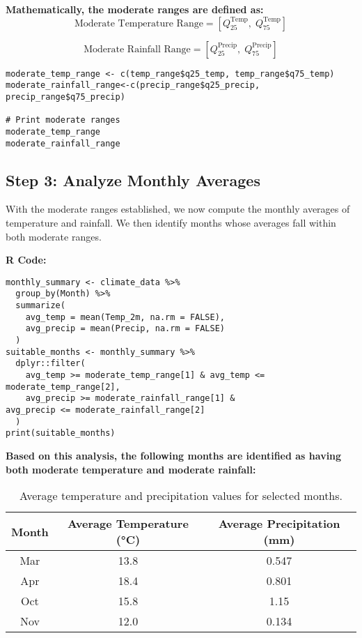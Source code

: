 \textbf{Mathematically, the moderate ranges are defined as:}
\[
\text{Moderate Temperature Range} = \left[ Q^{\text{Temp}}_{25},\; Q^{\text{Temp}}_{75} \right]
\]

\[
\text{Moderate Rainfall Range} = \left[ Q^{\text{Precip}}_{25},\; Q^{\text{Precip}}_{75} \right]
\]

\begin{verbatim}
moderate_temp_range <- c(temp_range$q25_temp, temp_range$q75_temp)
moderate_rainfall_range<-c(precip_range$q25_precip, precip_range$q75_precip)

# Print moderate ranges
moderate_temp_range
moderate_rainfall_range
\end{verbatim}

\subsection*{Step 3: Analyze Monthly Averages}
With the moderate ranges established, we now compute the monthly averages of temperature and rainfall. We then identify months whose averages fall within both moderate ranges.

\textbf{R Code:}
\begin{verbatim}
monthly_summary <- climate_data %>%
  group_by(Month) %>%
  summarize(
    avg_temp = mean(Temp_2m, na.rm = FALSE),
    avg_precip = mean(Precip, na.rm = FALSE)
  )
suitable_months <- monthly_summary %>%
  dplyr::filter(
    avg_temp >= moderate_temp_range[1] & avg_temp <= moderate_temp_range[2],
    avg_precip >= moderate_rainfall_range[1] & 
avg_precip <= moderate_rainfall_range[2]
  )
print(suitable_months)
\end{verbatim}

\textbf{Based on this analysis, the following months are identified as having both moderate temperature and moderate rainfall:}

\begin{table}[h!]
\centering
\begin{tabular}{|c|c|c|}
\hline
\textbf{Month} & \textbf{Average Temperature (°C)} & \textbf{Average Precipitation (mm)} \\
\hline
Mar & 13.8 & 0.547 \\
Apr & 18.4 & 0.801 \\
Oct & 15.8 & 1.15 \\
Nov & 12.0 & 0.134 \\
\hline
\end{tabular}
\caption{Average temperature and precipitation values for selected months.}
\end{table}

